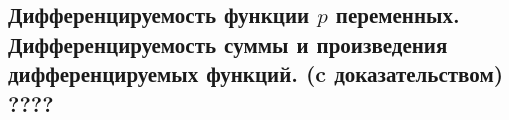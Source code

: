 {
\subsection{Дифференцируемость функции \(p\) переменных. Дифференцируемость суммы и произведения дифференцируемых функций. (c доказательством) ????}
}